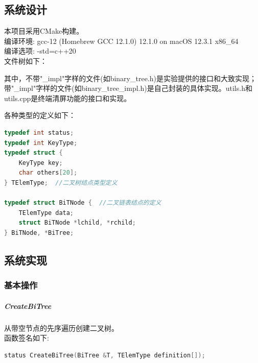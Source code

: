 \documentclass[supercite]{Experimental_Report}
\theoremstyle{definition}
\begin{document}
\subsection{系统设计}
\noindent
本项目采用CMake构建。 \\
编译环境: gcc-12 (Homebrew GCC 12.1.0) 12.1.0 on macOS 12.3.1 x86\_64  \\
编译选项: -std=c++20 \\
\newline
\noindent
文件树如下：

其中，不带"\_impl"字样的文件(如binary\_tree.h)是实验提供的接口和大致实现；带"\_impl"字样的文件(如binary\_tree\_impl.h)是自己封装的具体实现。utils.h和utils.cpp是终端清屏功能的接口和实现。

各种类型的定义如下：
\begin{lstlisting}[language=C++, frame=single]
typedef int status;
typedef int KeyType;
typedef struct {
	KeyType key;
	char others[20];
} TElemType;  //二叉树结点类型定义

typedef struct BiTNode {  //二叉链表结点的定义
	TElemType data;
	struct BiTNode *lchild, *rchild;
} BiTNode, *BiTree;
\end{lstlisting}

\subsection{系统实现}

\subsubsection{基本操作}

\subparagraph{CreateBiTree}
\noindent
从带空节点的先序遍历创建二叉树。\\
函数签名如下:
\begin{lstlisting}[language=C++, frame=single]
status CreateBiTree(BiTree &T, TElemType definition[]);
\end{lstlisting}
\end{document}

